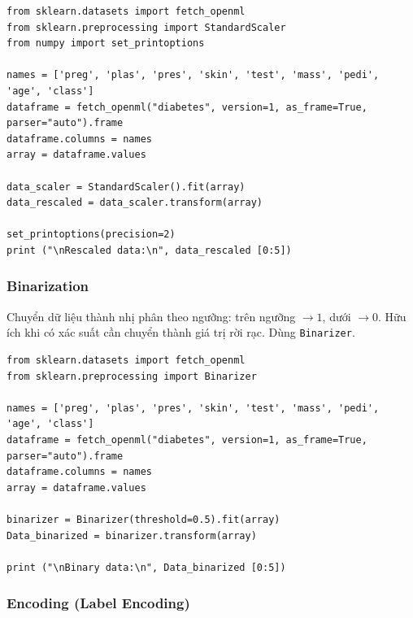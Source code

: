 \begin{vidu}[title={StandardScaler}]
\begin{lstlisting}
from sklearn.datasets import fetch_openml
from sklearn.preprocessing import StandardScaler
from numpy import set_printoptions

names = ['preg', 'plas', 'pres', 'skin', 'test', 'mass', 'pedi', 'age', 'class']
dataframe = fetch_openml("diabetes", version=1, as_frame=True, parser="auto").frame
dataframe.columns = names
array = dataframe.values

data_scaler = StandardScaler().fit(array)
data_rescaled = data_scaler.transform(array)

set_printoptions(precision=2)
print ("\nRescaled data:\n", data_rescaled [0:5])
\end{lstlisting}
\end{vidu}

\subsubsection{Binarization}

\begin{ynghia}[title={Binarize / threshold}]
Chuyển dữ liệu thành nhị phân theo ngưỡng: trên ngưỡng $\rightarrow 1$, dưới $\rightarrow 0$.
Hữu ích khi có xác suất cần chuyển thành giá trị rời rạc.
Dùng \texttt{Binarizer}.
\end{ynghia}

\begin{vidu}[title={Binarizer với threshold = 0.5}]
\begin{lstlisting}
from sklearn.datasets import fetch_openml
from sklearn.preprocessing import Binarizer

names = ['preg', 'plas', 'pres', 'skin', 'test', 'mass', 'pedi', 'age', 'class']
dataframe = fetch_openml("diabetes", version=1, as_frame=True, parser="auto").frame
dataframe.columns = names
array = dataframe.values

binarizer = Binarizer(threshold=0.5).fit(array)
Data_binarized = binarizer.transform(array)

print ("\nBinary data:\n", Data_binarized [0:5])
\end{lstlisting}
\end{vidu}

\subsubsection{Encoding (Label Encoding)}

